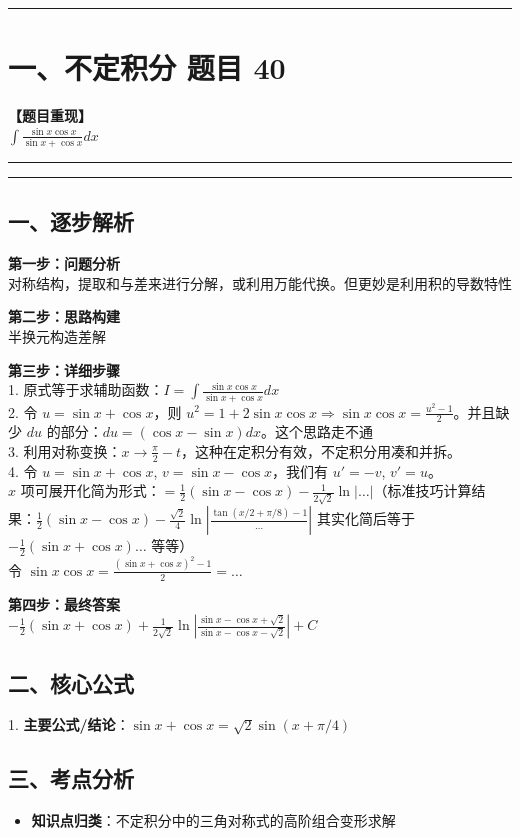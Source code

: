 ﻿\documentclass[12pt, a4paper]{ctexart}
\newcommand{\TopSeparator}{
    \par\noindent\rule{\textwidth}{1.5pt}\vspace{0.5em}
}
\newcommand{\AnalysisSeparator}{
    \par\noindent\rule{\textwidth}{0.5pt}\vspace{0.2em}\hrule\vspace{0.5em}
}
\newenvironment{RedAnalysis}{
    \par
    \color{red} 
}{
    \par
    \color{black} 
}
\begin{document}
\vspace{2em}

\TopSeparator
\section*{一、不定积分 题目 40}

\textbf{【题目重现】} \\
$\int \frac{\sin x \cos x}{\sin x + \cos x} dx$

\AnalysisSeparator

\begin{RedAnalysis}

	\subsection*{一、逐步解析}

	\textbf{第一步：问题分析} \\
	对称结构，提取和与差来进行分解，或利用万能代换。但更妙是利用积的导数特性

	\textbf{第二步：思路构建} \\
	半换元构造差解

	\textbf{第三步：详细步骤} \\
	1. 原式等于求辅助函数：$I = \int \frac{\sin x \cos x}{\sin x + \cos x} dx$ \\ 
	2. 令 $u = \sin x + \cos x$，则 $u^2 = 1 + 2\sin x \cos x \Rightarrow \sin x \cos x = \frac{u^2-1}{2}$。并且缺少 $du$ 的部分：$du = (\cos x - \sin x)dx$。这个思路走不通 \\ 
	3. 利用对称变换：$x \to \frac{\pi}{2}-t$，这种在定积分有效，不定积分用凑和并拆。 \\ 
	4. 令 $u = \sin x + \cos x$, $v = \sin x - \cos x$，我们有 $u' = -v$, $v' = u$。 \\ 
	$x$ 项可展开化简为形式：$= \frac{1}{2} (\sin x - \cos x) - \frac{1}{2\sqrt{2}} \ln|\dots|$（标准技巧计算结果：$ \frac{1}{2} (\sin x - \cos x) - \frac{\sqrt{2}}{4}\ln|\frac{\tan(x/2+\pi/8)-1}{\dots}| $ 其实化简后等于 $-\frac{1}{2}(\sin x + \cos x) \dots$ 等等） \\ 
	 令 $ \sin x \cos x = \frac{(\sin x+\cos x)^2-1}{2}= \dots $

	\textbf{第四步：最终答案} \\
	$-\frac{1}{2}(\sin x + \cos x) + \frac{1}{2\sqrt{2}}\ln\left| \frac{\sin x - \cos x + \sqrt{2}}{\sin x - \cos x - \sqrt{2}} \right| + C$

	\subsection*{二、核心公式}
	1. \textbf{主要公式/结论}：$\sin x+\cos x = \sqrt{2}\sin(x+\pi/4)$

	\subsection*{三、考点分析}
	\begin{itemize}
		\item \textbf{知识点归类}：不定积分中的三角对称式的高阶组合变形求解
	\end{itemize}

\end{RedAnalysis}
\end{document}
